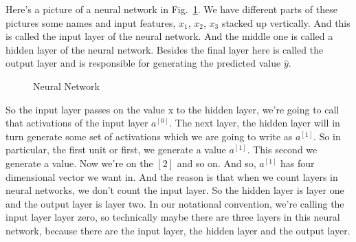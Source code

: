 \documentclass[a4paper]{article}
\begin{document}
Here's a picture of a neural network in Fig.~\ref{p12}. We have different parts of these pictures some names and input features, $x_1$, $x_2$, $x_3$ stacked up vertically. And this is called the input layer of the neural network. And the middle one is called a hidden layer of the neural network. Besides the final layer here is called the output layer and is responsible for generating the predicted value $\hat{y}$.
 \begin{figure}
 	\centering 
 	\caption{Neural Network} 
 	\label{p12} %
 \end{figure}
 
 So the input layer passes on the value x to the hidden layer, we're going to call that activations of the input layer $a^{[0]}$. The next layer, the hidden layer will in turn generate some set of activations which we are going to write as $a^{[1]}$. So in particular, the first unit or first, we generate a value $a^{[1]}$. This second we generate a value. Now we're on the $[2]$ and so on. And so,  $a^{[1]}$ has four dimensional vector we want in. And the reason is that when we count layers in neural networks, we don't count the input layer. So the hidden layer is layer one and the output layer is layer two. In our notational convention, we're calling the input layer layer zero, so technically maybe there are three layers in this neural network, because there are the input layer, the hidden layer and the output layer. 
 
\end{document}

